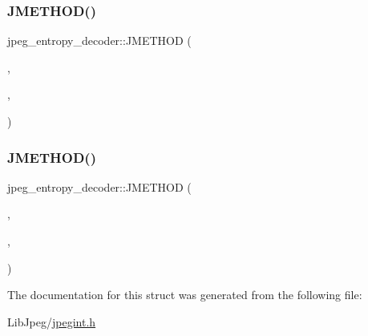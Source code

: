 \subsubsection{\texorpdfstring{JMETHOD()}{JMETHOD()}\hspace{0.1cm}{\footnotesize\ttfamily [1/2]}}
{\footnotesize\ttfamily jpeg\+\_\+entropy\+\_\+decoder\+::\+J\+M\+E\+T\+H\+OD (\begin{DoxyParamCaption}\item[{void}]{,  }\item[{\mbox{\hyperlink{jddctmgr_8c_a1964f006adb8fb80f57e455f6452aec1}{start\+\_\+pass}}}]{,  }\item[{(\mbox{\hyperlink{jpeglib_8h_a00c7d78af44bd26a901c791ccfc1e178}{j\+\_\+decompress\+\_\+ptr}} cinfo)}]{ }\end{DoxyParamCaption})}

\mbox{\label{structjpeg__entropy__decoder_a151f6f7497ba68935cca4b28ee75a596}} 
\subsubsection{\texorpdfstring{JMETHOD()}{JMETHOD()}\hspace{0.1cm}{\footnotesize\ttfamily [2/2]}}
{\footnotesize\ttfamily jpeg\+\_\+entropy\+\_\+decoder\+::\+J\+M\+E\+T\+H\+OD (\begin{DoxyParamCaption}\item[{\mbox{\hyperlink{jmorecfg_8h_a7c6368b321bd9acd0149b030bb8275ed}{boolean}}}]{,  }\item[{\mbox{\hyperlink{jdhuff_8c_a35432ad418198722f261a1f66b745595}{decode\+\_\+mcu}}}]{,  }\item[{(\mbox{\hyperlink{jpeglib_8h_a00c7d78af44bd26a901c791ccfc1e178}{j\+\_\+decompress\+\_\+ptr}} cinfo, \mbox{\hyperlink{jpeglib_8h_a04dea0959d9bd9e8ddad83597161453b}{J\+B\+L\+O\+C\+K\+R\+OW}} $\ast$M\+C\+U\+\_\+data)}]{ }\end{DoxyParamCaption})}



The documentation for this struct was generated from the following file\+:\begin{DoxyCompactItemize}
\item 
Lib\+Jpeg/\mbox{\hyperlink{jpegint_8h}{jpegint.\+h}}\end{DoxyCompactItemize}
